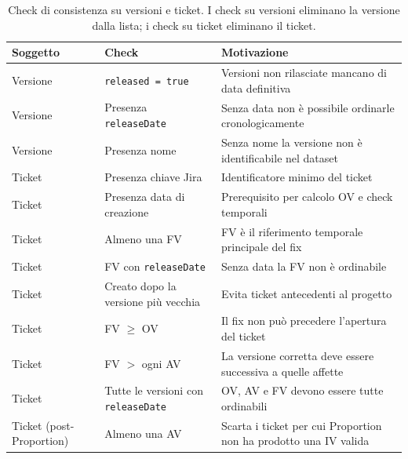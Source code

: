 \begin{table}[h!]
\centering
\small
\begin{tabular}{@{}p{}p{}p{}@{}}
\toprule
\textbf{Soggetto} & \textbf{Check} & \textbf{Motivazione} \\
\midrule
Versione & \texttt{released = true}            & Versioni non rilasciate mancano di data definitiva \\
Versione & Presenza \texttt{releaseDate}        & Senza data non è possibile ordinarle cronologicamente \\
Versione & Presenza nome                        & Senza nome la versione non è identificabile nel dataset \\
\midrule
Ticket   & Presenza chiave Jira                 & Identificatore minimo del ticket \\
Ticket   & Presenza data di creazione           & Prerequisito per calcolo OV e check temporali \\
Ticket   & Almeno una FV                        & FV è il riferimento temporale principale del fix \\
Ticket   & FV con \texttt{releaseDate}          & Senza data la FV non è ordinabile \\
Ticket   & Creato dopo la versione più vecchia  & Evita ticket antecedenti al progetto \\
Ticket   & FV $\geq$ OV                         & Il fix non può precedere l'apertura del ticket \\
Ticket   & FV $>$ ogni AV                       & La versione corretta deve essere successiva a quelle affette \\
Ticket   & Tutte le versioni con \texttt{releaseDate} & OV, AV e FV devono essere tutte ordinabili \\
\midrule
Ticket (post-Proportion) & Almeno una AV       & Scarta i ticket per cui Proportion non ha prodotto una IV valida \\
\bottomrule
\end{tabular}
\caption{Check di consistenza su versioni e ticket. I check su versioni eliminano la versione dalla lista; i check su ticket eliminano il ticket.}
\label{tab:m1-consistency}
\end{table}

